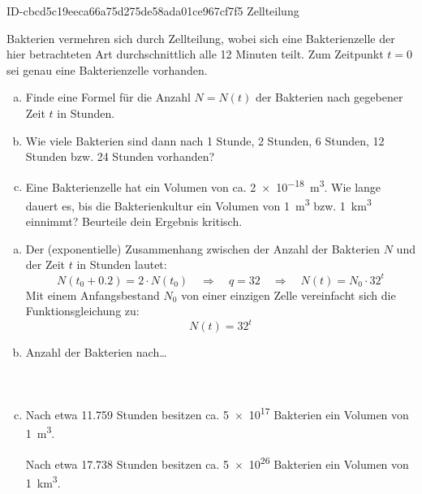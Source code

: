 \begin{exercise}
      {ID-cbcd5c19eeca66a75d275de58ada01ce967cf7f5}
      {Zellteilung}
  \ifproblem\problem\par
    Bakterien vermehren sich durch Zellteilung, wobei sich eine
    Bakterienzelle der hier betrachteten Art durchschnittlich
    alle 12 Minuten teilt. Zum Zeitpunkt $t=0$ sei genau eine
    Bakterienzelle vorhanden.
    \begin{enumerate}[a)]
      \item Finde eine Formel für die Anzahl $N=N(t)$
            der Bakterien nach gegebener Zeit $t$ in Stunden.
      \item Wie viele Bakterien sind dann nach 1 Stunde, 2 Stunden,
            6 Stunden, 12 Stunden bzw. 24 Stunden vorhanden?
      \item Eine Bakterienzelle hat ein Volumen von ca.
            \SI{2e-18}{\cubic\metre}. Wie lange dauert es, bis die Bakterienkultur
            ein Volumen von \SI{1}{\cubic\metre} bzw. \SI{1}{\cubic\kilo\metre}
            einnimmt? Beurteile dein Ergebnis kritisch.
    \end{enumerate}
  \fi
  \ifoutcome\outcome\par
    \begin{enumerate}[a)]
      \item Der (exponentielle) Zusammenhang zwischen der Anzahl der
            Bakterien $N$ und der Zeit $t$ in Stunden lautet:
            \begin{equation*}
              N\left(t_{0}+\num{0.2}\right)=2\cdot N(t_{0})
              \quad\Rightarrow\quad
              q=\num{32}
              \quad\Rightarrow\quad
              N(t)=N_{0}\cdot\num{32}^{t}
            \end{equation*}
            Mit einem Anfangsbestand $N_{0}$ von einer einzigen Zelle
            vereinfacht sich die Funktionsgleichung zu:
            \begin{equation*}
              N(t)=\num{32}^{t}
            \end{equation*}
      \item Anzahl der Bakterien nach\ldots\\
            \\
            \\
      \item Nach etwa \num{11.759} Stunden besitzen ca. \num{5e+17} Bakterien
            ein Volumen von \SI{1}{\cubic\metre}.\par
            Nach etwa \num{17.738} Stunden besitzen ca. \num{5e+26} Bakterien
            ein Volumen von \SI{1}{\cubic\kilo\metre}.
    \end{enumerate}
  \fi
\end{exercise}

